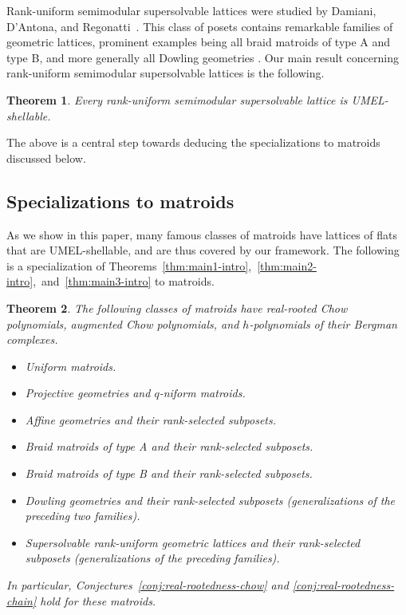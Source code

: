 \documentclass[11pt,a4paper]{amsart}
\theoremstyle{results}
\newtheorem{thm}{Theorem}[section]
\theoremstyle{definitions}
\begin{document}
Rank-uniform semimodular supersolvable lattices were studied by Damiani, D'Antona, and Regonatti~\cite{Damiani1994}. This class of posets contains remarkable families of geometric lattices, prominent examples being all braid matroids of type A and type B, and more generally all Dowling geometries \cite{dowling1973class,dowling1973q}. Our main result concerning rank-uniform semimodular supersolvable lattices is the following. 

\begin{thm}\label{thm:main4-intro}
    Every rank-uniform semimodular supersolvable lattice is UMEL-shellable.
\end{thm}

The above is a central step towards deducing the specializations to matroids discussed below.

\subsection{Specializations to matroids}

As we show in this paper, many famous classes of matroids have lattices of flats that are UMEL-shellable, and are thus covered by our framework. The following is a specialization of Theorems~\ref{thm:main1-intro},~\ref{thm:main2-intro},~and~\ref{thm:main3-intro} to matroids.

\begin{thm}\label{thm:main-matroid-specializations}
    The following classes of matroids have real-rooted Chow polynomials, augmented Chow polynomials, and $h$-polynomials of their Bergman complexes.
    \begin{itemize}[leftmargin=23pt,itemsep=-1pt]
        \item Uniform matroids.
        \item Projective geometries and $q$-niform matroids.
        \item Affine geometries and their rank-selected subposets.
        \item Braid matroids of type A and their rank-selected subposets.
        \item Braid matroids of type B and their rank-selected subposets.
        \item Dowling geometries and their rank-selected subposets (generalizations of the preceding two families).
        \item Supersolvable rank-uniform geometric lattices and their rank-selected subposets (generalizations of the preceding families).
    \end{itemize}
    In particular, Conjectures~\ref{conj:real-rootedness-chow} and \ref{conj:real-rootedness-chain} hold for these matroids.
\end{thm}
\end{document}
